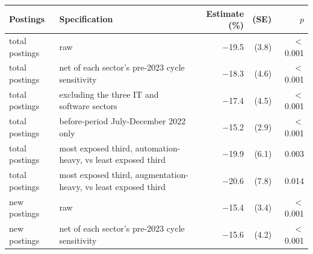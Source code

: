 \begin{tabular}{llrrr}
\toprule
Postings & Specification & Estimate (\%) & (SE) & $p$ \\
\midrule
total postings & raw & \ensuremath{-}19.5 & (3.8) & $<$0.001 \\
total postings & net of each sector's pre-2023 cycle sensitivity & \ensuremath{-}18.3 & (4.6) & $<$0.001 \\
total postings & excluding the three IT and software sectors & \ensuremath{-}17.4 & (4.5) & $<$0.001 \\
total postings & before-period July-December 2022 only & \ensuremath{-}15.2 & (2.9) & $<$0.001 \\
total postings & most exposed third, automation-heavy, vs least exposed third & \ensuremath{-}19.9 & (6.1) & 0.003 \\
total postings & most exposed third, augmentation-heavy, vs least exposed third & \ensuremath{-}20.6 & (7.8) & 0.014 \\
new postings & raw & \ensuremath{-}15.4 & (3.4) & $<$0.001 \\
new postings & net of each sector's pre-2023 cycle sensitivity & \ensuremath{-}15.6 & (4.2) & $<$0.001 \\
\bottomrule
\end{tabular}
